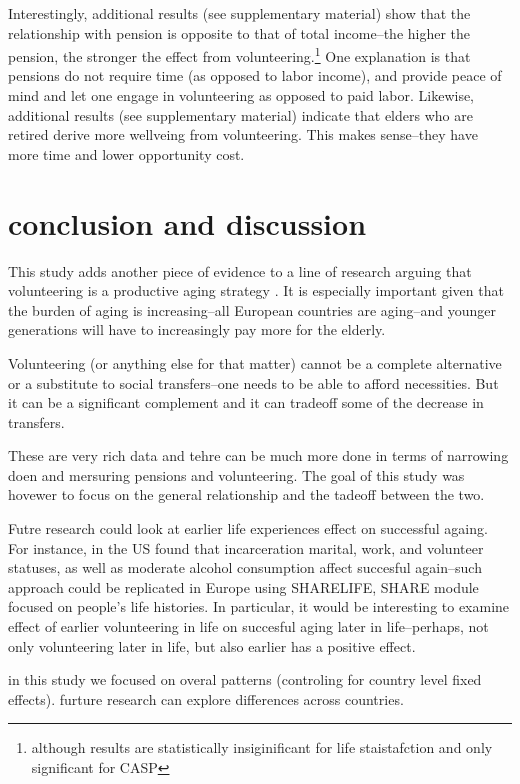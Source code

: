 \documentclass[10pt, letterpaper]{article}
\begin{document}
\begin{spacing}{1.4}
Interestingly, additional results (see supplementary material) show that the
relationship with pension is opposite to that of total income--the higher the
pension, the stronger the effect from volunteering.\footnote{although results are
statistically insiginificant for life staistafction and only significant for CASP} One explanation is that
pensions do not require time (as opposed to labor income), and provide peace of
mind and let one engage in volunteering as opposed to paid labor. 
Likewise, additional results (see supplementary material) indicate that elders
who are retired derive more wellveing from volunteering. This makes sense--they
have more time and lower opportunity cost. 


\section{conclusion and discussion}

This study adds another piece of evidence to a line of research arguing that
volunteering is a productive aging strategy \citep[e.g.,][]{wilson12B,hank09}.
It is especially important given that the burden of aging %
 is increasing--all European countries are aging--and younger generations will
 have to increasingly pay more for the elderly.

Volunteering (or anything else for that matter) cannot be a complete alternative
or a substitute to social transfers--one needs to be able to afford necessities.
But it can be a significant complement and
it can tradeoff some of the decrease in transfers.

These are very rich data and tehre can be much more done in terms of narrowing
doen and mersuring pensions and volunteering. The goal of this study was hovewer
to focus on the general relationship and the tadeoff between the two.

Futre research could look at earlier life experiences effect on successful
againg. For instance, in the US \citet{pruchno10} found that incarceration
 marital, work, and volunteer statuses, as well as moderate
alcohol consumption affect succesful again--such approach could be
replicated in Europe using SHARELIFE, SHARE module focused on people's life
histories. In particular, it would be interesting to examine effect of earlier
volunteering in life on succesful aging later in life--perhaps, not only
volunteering later in life, but also earlier has a positive effect. 


in this study we focused on overal patterns (controling for country level fixed
effects). furture research can explore differences across countries. 


\end{spacing}
\end{document}
